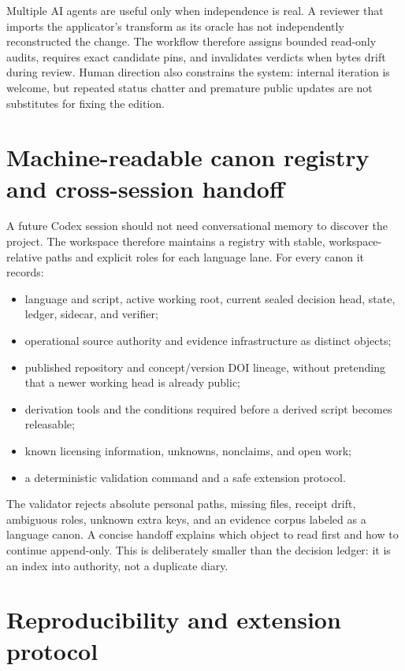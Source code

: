 \documentclass[11pt,a4paper]{article}
\begin{document}
Multiple AI agents are useful only when independence is real. A reviewer that imports the applicator's transform as its oracle has not independently reconstructed the change. The workflow therefore assigns bounded read-only audits, requires exact candidate pins, and invalidates verdicts when bytes drift during review. Human direction also constrains the system: internal iteration is welcome, but repeated status chatter and premature public updates are not substitutes for fixing the edition.

\section{Machine-readable canon registry and cross-session handoff}\label{sec:registry}

A future Codex session should not need conversational memory to discover the project. The workspace therefore maintains a registry with stable, workspace-relative paths and explicit roles for each language lane. For every canon it records:

\begin{itemize}
  \item language and script, active working root, current sealed decision head, state, ledger, sidecar, and verifier;
  \item operational source authority and evidence infrastructure as distinct objects;
  \item published repository and concept/version DOI lineage, without pretending that a newer working head is already public;
  \item derivation tools and the conditions required before a derived script becomes releasable;
  \item known licensing information, unknowns, nonclaims, and open work;
  \item a deterministic validation command and a safe extension protocol.
\end{itemize}

The validator rejects absolute personal paths, missing files, receipt drift, ambiguous roles, unknown extra keys, and an evidence corpus labeled as a language canon. A concise handoff explains which object to read first and how to continue append-only. This is deliberately smaller than the decision ledger: it is an index into authority, not a duplicate diary.

\section{Reproducibility and extension protocol}
\end{document}
